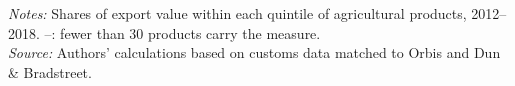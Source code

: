 \documentclass[11pt,a4paper]{article}
\newcommand{\srcnote}{\textit{Source:} Authors' calculations based on customs data matched to Orbis and Dun \& Bradstreet.}
\begin{document}
\begin{table}[H]\centering\footnotesize%
  \caption{Multinational Share of Agricultural Exports, by Quintile of Each Sophistication Measure}%
  \label{tab:ap_quint}%
  \par\vspace{3pt}%
  \begin{minipage}{0.95\textwidth}\footnotesize %
  \textit{Notes:} Shares of export value within each quintile of agricultural products, 2012--2018. --: fewer than 30 products carry the measure.\\[3pt]%
  \srcnote%
  \end{minipage}%
  \end{table}
\end{document}
